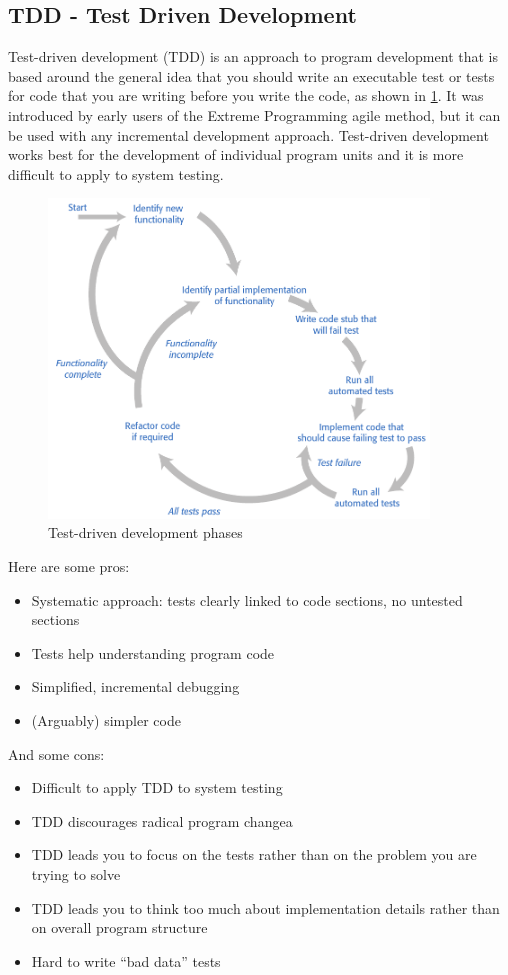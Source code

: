 \documentclass[10pt,a4paper]{report}
\begin{document}
\subsection{TDD - Test Driven Development}
 Test-driven development (TDD) is an approach to program development
that is based around the general idea that you should write an
executable test or tests for code that you are writing before you write the
code, as shown in \ref{image108}. 
It was introduced by early users of the Extreme Programming agile
method, but it can be used with any incremental development approach.
Test-driven development works best for the development of individual
program units and it is more difficult to apply to system testing.
\begin{figure}[h]
	\centering
	\includegraphics[width=0.9\textwidth]{image108}
	\caption{Test-driven development phases}
	\label{image108}
\end{figure} 

Here are some pros:
\begin{itemize}
	\item Systematic approach: tests clearly
	linked to code sections, no
	untested sections
	\item Tests help understanding program
	code
	\item Simplified, incremental debugging
	\item (Arguably) simpler code
\end{itemize}
And some cons:
\begin{itemize}
	\item Difficult to apply TDD to system
	testing
	\item TDD discourages radical program
	changea
	\item TDD leads you to focus on the tests
	rather than on the problem you are
	trying to solve
	\item TDD leads you to think too much
	about implementation details
	rather than on overall program
	structure
	\item Hard to write “bad data” tests
\end{itemize}
\end{document}
